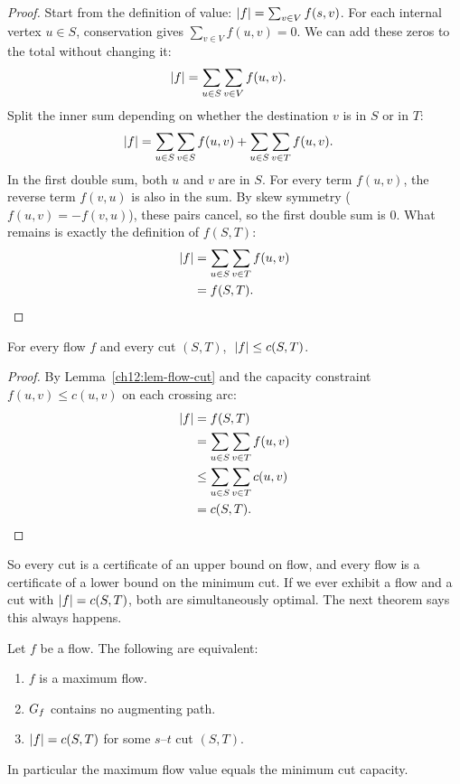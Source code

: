 \begin{proof}
Start from the definition of value: $\lvert f\rvert=\sum_{v\in V} f(s,v)$. For each internal vertex $u\in S$, conservation gives $\sum_{v\in V} f(u,v)=0$. We can add these zeros to the total without changing it:
\begin{align*}
  \lvert f\rvert &= \sum_{u\in S}\sum_{v\in V} f(u,v).
\end{align*}
Split the inner sum depending on whether the destination $v$ is in $S$ or in $T$:
\begin{align*}
  \lvert f\rvert &= \sum_{u\in S}\sum_{v\in S} f(u,v) + \sum_{u\in S}\sum_{v\in T} f(u,v).
\end{align*}
In the first double sum, both $u$ and $v$ are in $S$. For every term $f(u,v)$, the reverse term $f(v,u)$ is also in the sum. By skew symmetry ($f(u,v) = -f(v,u)$), these pairs cancel, so the first double sum is $0$. What remains is exactly the definition of $f(S,T)$:
\begin{align*}
  \lvert f\rvert &= \sum_{u\in S}\sum_{v\in T} f(u,v) \\
  &= f(S,T). \qedhere
\end{align*}
\end{proof}

\begin{corollary}
\label{ch12:cor-weak}
For every flow $f$ and every cut $(S,T)$, $\;\lvert f\rvert\le c(S,T)$.
\end{corollary}

\begin{proof}
By Lemma~\ref{ch12:lem-flow-cut} and the capacity constraint $f(u,v) \le c(u,v)$ on each crossing arc:
\begin{align*}
  \lvert f\rvert &= f(S,T) \\
  &= \sum_{u\in S}\sum_{v\in T} f(u,v) \\
  &\le \sum_{u\in S}\sum_{v\in T} c(u,v) \\
  &= c(S,T). \qedhere
\end{align*}
\end{proof}

So every cut is a certificate of an upper bound on flow, and every flow is a
certificate of a lower bound on the minimum cut. If we ever exhibit a flow and a
cut with $\lvert f\rvert=c(S,T)$, both are simultaneously optimal. The next theorem says
this always happens.

\begin{theorem}
\label{ch12:thm-mfmc}
Let $f$ be a flow. The following are equivalent:
\begin{enumerate}
  \item $f$ is a maximum flow.
  \item $G_f$ contains no augmenting path.
  \item $\lvert f\rvert=c(S,T)$ for some $s$--$t$ cut $(S,T)$.
\end{enumerate}
In particular the maximum flow value equals the minimum cut capacity.
\end{theorem}


